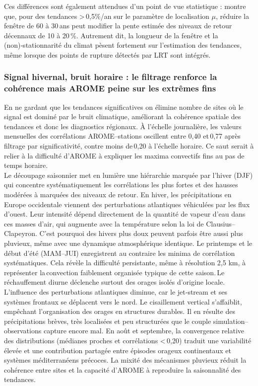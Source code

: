 \documentclass[
  article,
  nofooter,
  noheadings]{jss}
\begin{document}
Ces différences sont également attendues d'un point de vue statistique :
\citet{DeGaetano2018} montre que, pour des tendances
\textgreater\,0,5\%/an sur le paramètre de localisation \(\mu\), réduire
la fenêtre de 60 à 30\,ans peut modifier la pente estimée des niveaux de
retour décennaux de 10 à 20\,\%. Autrement dit, la longueur de la
fenêtre et la (non)‑stationnarité du climat pèsent fortement sur
l'estimation des tendances, même lorsque des points de rupture détectés
par LRT sont intégrés.

\subsubsection{Signal hivernal, bruit horaire : le filtrage renforce la
cohérence mais AROME peine sur les extrêmes
fins}\label{signal-hivernal-bruit-horaire-le-filtrage-renforce-la-cohuxe9rence-mais-arome-peine-sur-les-extruxeames-fins}

En ne gardant que les tendances significatives on élimine nombre de
sites où le signal est dominé par le bruit climatique, améliorant la
cohérence spatiale des tendances et donc les diagnostics régionaux. À
l'échelle journalière, les valeurs mensuelles des corrélations
AROME--stations oscillent entre 0,40 et\,0,77 après filtrage par
significativité, contre moins de\,0,20 à l'échelle horaire. Ce saut
serait à relier à la difficulté d'AROME à expliquer les maxima
convectifs fins au pas de temps horaire.\\

Le découpage saisonnier met en lumière une hiérarchie marquée par
l'hiver (DJF) qui concentre systématiquement les corrélations les plus
fortes et des hausses modérées à marquées des niveaux de retour. En
hiver, les précipitations en Europe occidentale viennent des
perturbations atlantiques véhiculées par les flux d'ouest. Leur
intensité dépend directement de la quantité de vapeur d'eau dans ces
masses d'air, qui augmente avec la température selon la loi de
Clausius--Clapeyron. C'est pourquoi des hivers plus doux peuvent parfois
être aussi plus pluvieux, même avec une dynamique atmosphérique
identique. Le printemps et le début d'été (MAM--JUI) enregistrent au
contraire les minima de corrélation systématiques. Cela révèle la
difficulté persistante, même à résolution 2,5 km, à représenter
la\,convection faiblement organisée typique de cette saison.\,Le
réchauffement diurne déclenche surtout des orages isolés d'origine
locale. L'influence des perturbations atlantiques diminue, car le
jet‑stream et ses systèmes frontaux se déplacent vers le nord. Le
cisaillement vertical s'affaiblit, empêchant l'organisation des orages
en structures durables. Il en résulte des précipitations brèves, très
localisées et peu structurées que le couple simulation--observations
capture encore mal. En août et septembre, la convergence relative des
distributions (médianes proches et corrélations \textless\,0,20) traduit
une variabilité élevée et une contribution partagée entre épisodes
orageux continentaux et systèmes méditerranéens précoces. La mixité des
mécanismes pluvieux réduit la cohérence entre sites et la capacité
d'AROME à reproduire la saisonnalité des tendances.
\end{document}
